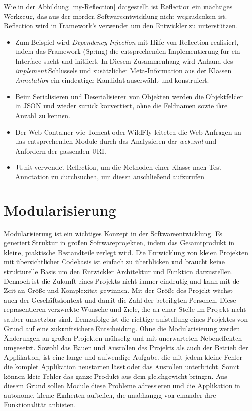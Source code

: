 Wie in der Abbildung \ref{my-Reflection} dargestellt ist Reflection ein mächtiges Werkzeug, das aus der morden Softwareentwicklung nicht wegzudenken ist. Reflection wird in Framework's verwendet um den Entwickler zu unterstützen. 
\begin{itemize}
  \item Zum Beispiel wird \textit{Dependency Injection} mit Hilfe von Reflection realisiert, indem das Framework (Spring) die entsprechenden Implementierung für ein Interface sucht und initiiert. In Diesem Zusammenhang wird Anhand des \textit{implement} Schlüssels und zusätzlicher Meta-Information aus der Klassen \textit{Annotation} ein eindeutiger Kandidat auserwählt und konstruiert.
  \item Beim Serialisieren und Deserialisieren von Objekten werden die Objektfelder in JSON und wieder zurück konvertiert, ohne die Feldnamen sowie ihre Anzahl zu kennen.
  \item Der Web-Container wie Tomcat oder WildFly leiteten die Web-Anfragen an das entsprechenden Module durch das Analysieren der \textit{web.xml} und Anfordern der passenden URI.
  \item JUnit verwendet Reflection, um die Methoden einer Klasse nach Test-Annotation zu durchsuchen, um diesen anschließend aufzurufen.
\end{itemize}

\section{Modularisierung}
\label{sec:modularisierung}
  Modularisierung ist ein wichtiges Konzept in der Softwareentwicklung. 
  Es generiert  Struktur in großen Softwareprojekten, indem das Gesamtprodukt in kleine, praktische Bestandteile zerlegt wird.
  \newline Die Entwicklung von kleien Projekten mit übersichtlicher Codebasis ist einfach zu überblicken und braucht keine strukturelle Basis um den Entwickler Architektur und Funktion darzustellen. 
  Dennoch ist die Zukunft eines Projekts nicht immer eindeutig und kann mit de Zeit an Größe und Komplexität gewinnen. 
  Mit der Größe des Projekt wächst auch der Geschäftskontext und damit die Zahl der beteiligten Personen. Diese repräsentieren verzwickte Wünsche und Ziele, die an einer Stelle im Projekt nicht sauber umsetzbar sind.
  Demzufolge ist die richtige aufstellung eines Projektes von Grund auf eine zukunftsichere Entscheidung. 
  \newline Ohne die Modularisierung werden Änderungen an großen Projekten mühselig und mit unerwarteten Nebeneffekten umgesetzt. 
  Sowohl das Bauen und Ausrollen des Projekts als auch der Betrieb der Applikation, ist eine lange und aufwendige Aufgabe, die mit jedem kleine Fehler die komplet Applikation neustarten lässt oder das Ausrollen unterbricht. 
  Somit können kleie Fehler das ganze Produkt aus dem gleichgewicht bringen.
  Aus diesem Grund sollen Module diese Probleme adressieren und die Applikation in autonome, kleine Einheiten aufteilen, die unabhängig von einander ihre Funktionalität anbieten.   

